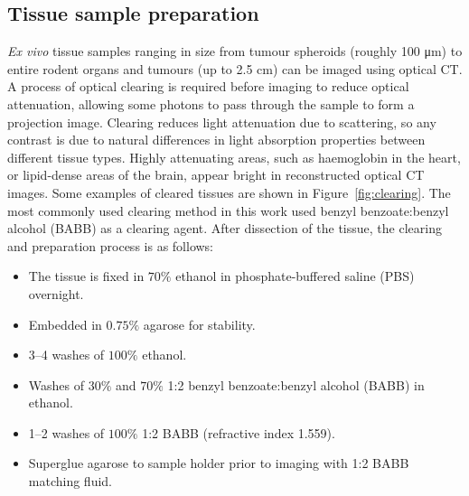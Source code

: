 









\subsection{Tissue sample preparation}


\emph{Ex vivo} tissue samples ranging in size from tumour spheroids (roughly 100 \si{\um}) to entire rodent organs and tumours (up to 2.5 cm) can be imaged using optical CT. A process of optical clearing is required before imaging to reduce  optical attenuation, allowing some photons to pass through the sample to form a projection image.
Clearing reduces light attenuation due to scattering, so any contrast is due to natural differences in light absorption properties between different tissue types. Highly attenuating areas, such as haemoglobin in the heart, or lipid-dense areas of the brain, appear bright in reconstructed optical CT images. Some examples of cleared tissues are shown in Figure~\ref{fig:clearing}.
The most commonly used clearing method in this work used benzyl benzoate:benzyl alcohol (BABB) as a clearing agent. After dissection of the tissue, the clearing and preparation process is as follows: 

\begin{itemize}
	\item The tissue is fixed in $70\%$ ethanol in phosphate-buffered saline (PBS) overnight.
	\item Embedded in $0.75\%$ agarose for stability.
	\item 3--4 washes of $100\%$ ethanol.
	\item Washes of $30\%$ and $70\%$ 1:2 benzyl benzoate:benzyl alcohol (BABB) in ethanol.
	\item 1--2 washes of $100\%$ 1:2 BABB (refractive index 1.559).
	\item Superglue agarose to sample holder prior to imaging with 1:2 BABB matching fluid.
\end{itemize}


